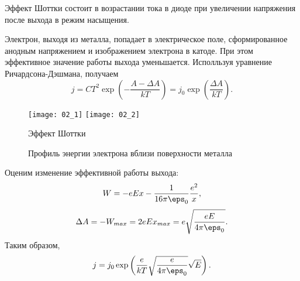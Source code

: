 Эффект Шоттки состоит в возрастании тока в диоде при увеличении напряжения после
выхода в режим насыщения.

Электрон, выходя из металла, попадает в электрическое поле, сформированное
анодным напряжением и изображением электрона в катоде. При этом эффективное
значение работы выхода уменьшается. Исполльзуя уравнение Ричардсона-Дэшмана,
получаем
\[
    j = CT^2\exp\left(-\frac{A-\Delta A}{kT}\right) =
    j_0\exp\left(\frac{\Delta A}{kT}\right).
\]
\begin{figure}[h]
\begin{center}
    \texttt{[image: 02\_1]} \hfill
    \texttt{[image: 02\_2]}
    \parbox[t]{.47\textwidth}
    {\caption{Эффект Шоттки}}\hfill
    \parbox[t]{.47\textwidth}
    {\caption{Профиль энергии электрона вблизи поверхности металла}}
\end{center}
\end{figure}

Оценим изменение эффективной работы выхода:
\[
    W = -eEx - \frac{1}{16\pi\eps_0}\frac{e^2}{x},
\]
\[
    \Delta A = -W_{max} = 2eEx_{max} = e\sqrt{\frac{eE}{4\pi\eps_0}}.
\]
Таким образом,
\[
    j = j_0\exp\left(\frac{e}{kT}\sqrt{\frac{e}{4\pi\eps_0}}\sqrt{E}\right).
\]
